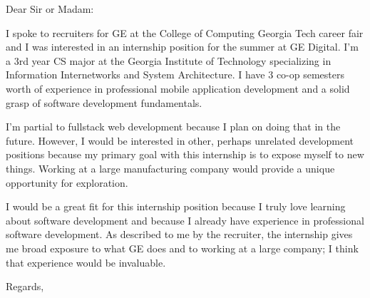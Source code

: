 \documentclass{letter}
\begin{document}
\begin{letter}{}
\opening{Dear Sir or Madam:}

I spoke to recruiters for GE at the College of Computing Georgia Tech career fair and I was interested in an internship position for the summer at GE Digital. I'm a 3rd year CS major at the Georgia Institute of Technology specializing in Information Internetworks and System Architecture. I have 3 co-op semesters worth of experience in professional mobile application development and a solid grasp of software development fundamentals. 

I'm partial to fullstack web development because I plan on doing that in the future. However, I would be interested in other, perhaps unrelated development positions because my primary goal with this internship is to expose myself to new things. Working at a large manufacturing company would provide a unique opportunity for exploration.

I would be a great fit for this internship position because I truly love learning about software development and because I already have experience in professional software development. As described to me by the recruiter, the internship gives me broad exposure to what GE does and to working at a large company; I think that experience would be invaluable.




\closing{Regards,}
\end{letter}
\end{document}
